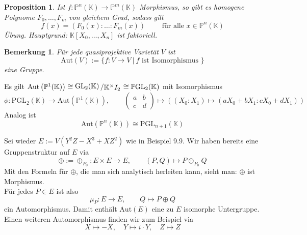 \documentclass[11pt]{book}
\newtheorem{prop}[theorem]{Proposition}
\newtheorem{remark}[theorem]{Bemerkung}
\theoremstyle{nonumberbreak}
\newenvironment{pr}[1][]{\ifthenelse{\equal{#1}{}}{\proof}{\proof[#1]}\rm}{\endproof}
\newenvironment{ex}[1][]{\ifthenelse{\equal{#1}{}}{\example}{\example[#1]}\rm}{\endexample}
\newcommand{\slant}[2]{{\raisebox{.1em}{$#1$}\left/\raisebox{-.1em}{$#2$}\right.}}
\begin{document}
\begin{spacing}{1.3}
\begin{prop} %

Ist $f: \mathbb{P}^n(\mathbb{K}) \longrightarrow \mathbb{P}^m(\mathbb{K})$ Morphismus, so gibt es homogene Polynome $F_0, \ldots, F_m$ von gleichem Grad, sodass gilt
$$f(x)= \left(F_0(x): \ldots : F_m(x) \right) \qquad \textrm{ für alle } x \in \mathbb{P}^n(\mathbb{K})$$
\begin{pr}
Übung. Hauptgrund: $\mathbb{K}[X_0, \ldots, X_n]$ ist faktoriell.
\end{pr}
\end{prop}

\begin{remark} %
Für jede quasiprojektive Varietät $V$ ist
$$\textrm{Aut}(V):= \{f: V \longrightarrow V \ \vert \ f \textrm{ ist Isomorphismus } \}$$
eine Gruppe.
\end{remark}

\begin{ex} %

Es gilt
$\textrm{Aut}\left(\mathbb{P}^1(\mathbb{K})\right) \cong \slant{\textrm{GL}_2(\mathbb{K})}{\mathbb{K}^{\times} I_2} \cong \mathbb{P}\textrm{GL}_2(\mathbb{K})$
mit Isomorphismus
$$\phi:  \textrm{PGL}_2(\mathbb{K}) \longrightarrow \textrm{Aut}\left(\mathbb{P}^1(\mathbb{K})\right), \qquad \begin{pmatrix} a & b \\ c & d \end{pmatrix} \mapsto \left( (X_0:X_1) \mapsto \left(aX_0+bX_1 : cX_0+dX_1\right) \right)$$
Analog ist 
$$\textrm{Aut}\left(\mathbb{P}^n(\mathbb{K})\right) \cong \textrm{PGL}_{n+1}(\mathbb{K})$$
\end{ex}

\begin{ex} %

Sei wieder $E:= V (Y^2Z-X^3+XZ^2)$ wie in Beispiel 9.9. Wir haben bereits eine Gruppenstruktur auf $E$ via
$$\oplus:=\oplus_{P_0}: E \times E \longrightarrow E, \qquad (P,Q) \mapsto P \oplus_{P_0} Q$$
Mit den Formeln für $\oplus$, die man sich analytisch herleiten kann, sieht man: $\oplus$ ist Morphismus.\\
Für jedes $P \in E$ ist also 
$$\mu_P: E \longrightarrow E, \qquad Q \mapsto P \oplus Q$$
ein Automorphismus. Damit enthält $\textrm{Aut}(E)$ eine zu $E$ isomorphe Untergruppe. Einen weiteren Automorphismus finden wir zum Beispiel via
$$X \mapsto -X, \quad Y \mapsto i \cdot Y, \quad Z \mapsto Z$$
\end{ex}













\end{spacing}
\end{document}
